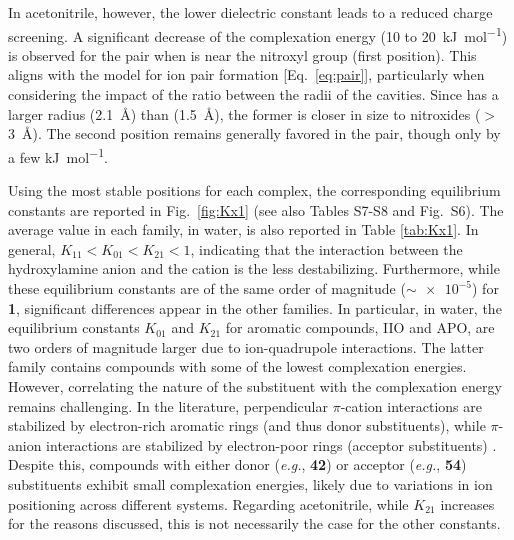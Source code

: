 \documentclass[review,preprint]{elsarticle}
\begin{document}
In acetonitrile, however, the lower dielectric constant leads to a reduced charge screening. A significant decrease of the complexation energy (10 to \SI{20}{\kilo\joule\per\mole}) is observed for the  pair when  is near the nitroxyl group (first position). This aligns with the model for ion pair formation [Eq.~\eqref{eq:pair}], particularly when considering the impact of the ratio between the radii of the cavities. Since  has a larger radius (\SI{2.1}{\angstrom}) than  (\SI{1.5}{\angstrom}), the former is closer in size to nitroxides ($>$\SI{3}{\angstrom}). The second position remains generally favored in the  pair, though only by a few \si{\kilo\joule\per\mole}.

Using the most stable positions for each complex, the corresponding equilibrium constants are reported in Fig.~\ref{fig:Kx1} (see also Tables S7-S8 and Fig.~S6). The average value in each family, in water, is also reported in Table \ref{tab:Kx1}. In general, $K_{11} < K_{01} < K_{21} < 1$, indicating that the interaction between the hydroxylamine anion and the cation is the less destabilizing. Furthermore, while these equilibrium constants are of the same order of magnitude ($\sim \num{e-5}$) for \textbf{1}, significant differences appear in the other families. 
In particular, in water, the equilibrium constants $K_{01}$ and $K_{21}$ for aromatic compounds, IIO and APO, are two orders of magnitude larger due to ion-quadrupole interactions. The latter family contains compounds with some of the lowest complexation energies. However, correlating the nature of the substituent with the complexation energy remains challenging. In the literature, perpendicular $\pi$-cation interactions are stabilized by electron-rich aromatic rings (and thus donor substituents), while $\pi$-anion interactions are stabilized by electron-poor rings (acceptor substituents) \cite{pappFourFacesInteraction2017}. Despite this, compounds with either donor (\textit{e.g.}, \textbf{42}) or acceptor (\textit{e.g.}, \textbf{54}) substituents exhibit small complexation energies, likely due to variations in ion positioning across different systems. Regarding acetonitrile, while $K_{21}$ increases for the reasons discussed, this is not necessarily the case for the other constants. 
\end{document}
